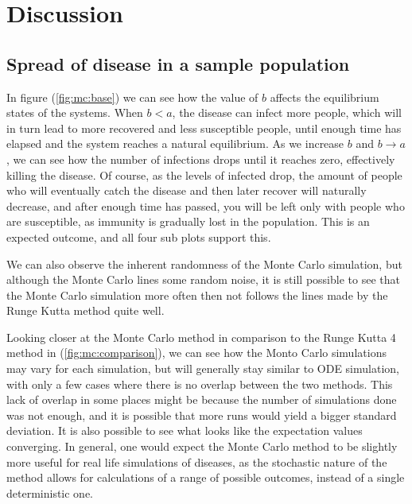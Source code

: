 \documentclass[../main.tex]{subfiles}
\begin{document}
\section{Discussion}\label{sec:discussion}



\subsection{Spread of disease in a sample population}
In figure (\ref{fig:mc:base}) we can see how the value of $b$ affects the equilibrium states of the systems. When $b < a$, the disease can infect more people, which will in turn lead to more recovered and less susceptible people, until enough time has elapsed and the system reaches a natural equilibrium. As we increase $b$ and $b \rightarrow a$, we can see how the number of infections drops until it reaches zero, effectively killing the disease. Of course, as the levels of infected drop, the amount of people who will eventually catch the disease and then later recover will naturally decrease, and after enough time has passed, you will be left only with people who are susceptible, as immunity is gradually lost in the population. This is an expected outcome, and all four sub plots support this. 

We can also observe the inherent randomness of the Monte Carlo simulation, but although the Monte Carlo lines some random noise, it is still possible to see that the Monte Carlo simulation more often then not follows the lines made by the Runge Kutta method quite well. 

Looking closer at the Monte Carlo method in comparison to the Runge Kutta 4 method in (\ref{fig:mc:comparison}), we can see how the Monto Carlo simulations may vary for each simulation, but will generally stay similar to ODE simulation, with only a few cases where there is no overlap between the two methods. This lack of overlap in some places might be because the number of simulations done was not enough, and it is possible that more runs would yield a bigger standard deviation. It is also possible to see what looks like the expectation values converging. 
In general, one would expect the Monte Carlo method to be slightly more useful for real life simulations of diseases, as the stochastic nature of the method allows for calculations of a range of possible outcomes, instead of a single deterministic one.
\end{document}
